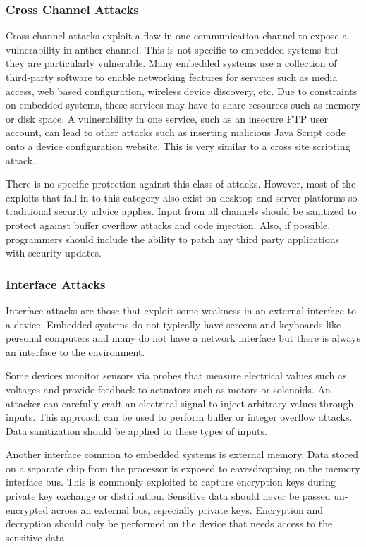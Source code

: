 \documentclass[final,conference,11pt]{IEEEtran}
\begin{document}
\subsubsection{Cross Channel Attacks}
Cross channel attacks exploit a flaw in one communication channel to expose a vulnerability in anther channel.  This is not specific to embedded systems but they are particularly vulnerable.  Many embedded systems use a collection of third-party software to enable networking features for services such as media access, web based configuration, wireless device discovery, etc.  Due to constraints on embedded systems, these services may have to share resources such as memory or disk space.   A vulnerability in one service, such as an insecure FTP user account, can lead to other attacks such as inserting malicious Java Script code onto a device configuration website.  This is very similar to a cross site scripting attack. \cite{Bojinov2010}

There is no specific protection against this class of attacks.  However, most of the exploits that fall in to this category also exist on desktop and server platforms so traditional security advice applies.  Input from all channels should be sanitized to protect against buffer overflow attacks and code injection.  Also, if possible, programmers should include the ability to patch any third party applications with security updates. \cite{Bojinov2010}

\subsubsection{Interface Attacks}
Interface attacks are those that exploit some weakness in an external interface to a device.  Embedded systems do not typically have screens and keyboards like personal computers and many do not have a network interface but there is always an interface to the environment.  

Some devices monitor sensors via probes that measure electrical values such as voltages and provide feedback to actuators such as motors or solenoids. An attacker can carefully craft an electrical signal to inject arbitrary values through inputs.  This approach can be used to perform buffer or integer overflow attacks.  Data sanitization should be applied to these types of inputs.\cite{Jyostna2011} 

Another interface common to embedded systems is external memory.  Data stored on a separate chip from the processor is exposed to eavesdropping on the memory interface bus.  This is commonly exploited to capture encryption keys during private key exchange or distribution.  Sensitive data should never be passed un-encrypted across an external bus, especially private keys.  Encryption and decryption should only be performed on the device that needs access to the sensitive data.\cite{Vaslin2009}
\end{document}
